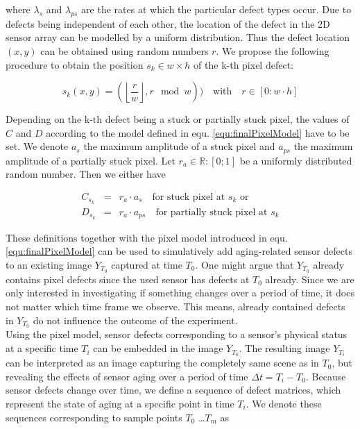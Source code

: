 \documentclass[10pt,twocolumn,letterpaper]{article}
\providecommand{\myfloor}[1]{\left \lfloor #1 \right \rfloor }
\begin{document}
where $\lambda_s$ and $\lambda_{ps}$ are the rates at which the particular defect types occur. Due to defects being independent of each other, the location of the defect in the 2D sensor array can be modelled by a uniform distribution. Thus the defect location $(x,y)$ can be obtained using random numbers $r$. We propose the following procedure to obtain the position $s_k \in {w \times h}$ of the k-th pixel defect:

\begin{equation}
 s_k(x,y) = (\myfloor{\frac{r}{w}}, r \mod{w})) \quad \text{with} \quad r \in [0:w \cdot h]
\end{equation}

Depending on the k-th defect being a stuck or partially stuck pixel, the values of $C$ and $D$ according to the model defined in equ. \ref{equ:finalPixelModel} have to be set. We denote $a_s$ the maximum amplitude of a stuck pixel and $a_{ps}$ the maximum amplitude of a partially stuck pixel. Let $r_a \in \mathbb{R}:[0;1]$ be a uniformly distributed random number. Then we either have

\begin{eqnarray}
   C_{s_k}  & = & r_a \cdot a_s \quad \text{for stuck pixel at } s_k \text{ or} \\
   D_{s_k} & = &  r_a \cdot a_{ps} \quad \text{for partially stuck pixel at } s_k
\end{eqnarray}

These definitions together with the pixel model introduced in equ. \ref{equ:finalPixelModel} can be used to simulatively add aging-related sensor defects to an existing image $Y_{T_0}$ captured at time ${T_0}$. One might argue that $Y_{T_0}$ already contains pixel defects since the used sensor has defects at $T_0$ already. Since we are only interested in investigating if something changes over a period of time, it does not matter which time frame we observe. This means, already contained defects in $Y_{T_0}$ do not influence the outcome of the experiment. \\
Using the pixel model, sensor defects corresponding to a sensor's physical status at a specific time $T_i$ can be embedded in the image $Y_{T_0}$. The resulting image $Y_{T_i}$ can be interpreted as an image capturing the completely same scene as in $T_0$, but revealing the effects of sensor aging over a period of time $\Delta t = {T_i} - {T_0}$. Because sensor defects change over time, we define a sequence of defect matrices, which represent the state of aging at a specific point in time $T_i$. We denote these sequences corresponding to sample points $T_0$ \dots $T_m$ as
\end{document}

